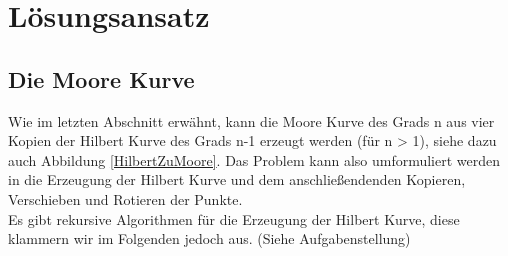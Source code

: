 \documentclass[course=erap]{aspdoc}
\begin{document}




\section{Lösungsansatz}

\subsection{Die Moore Kurve}

Wie im letzten Abschnitt erwähnt, kann die Moore Kurve des Grads n aus vier Kopien der Hilbert Kurve des Grads n-1 erzeugt werden (für n > 1), siehe dazu auch Abbildung \ref{HilbertZuMoore}.
Das Problem kann also umformuliert werden in die Erzeugung der Hilbert Kurve und dem anschließendenden Kopieren, Verschieben und Rotieren der Punkte. 
\\
Es gibt rekursive Algorithmen für die Erzeugung der Hilbert Kurve, diese klammern wir im Folgenden jedoch aus. (Siehe Aufgabenstellung)
\end{document}

